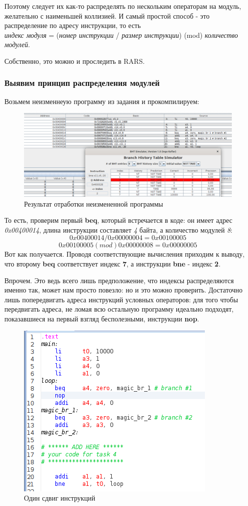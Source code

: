 Поэтому следует их как-то распределять по нескольким операторам на модуль, желательно с наименьшей коллизией. И самый простой способ - это распределение по адресу инструкции, то есть \\
\textit{индекс модуля} = (\textit{номер инструкции} / \textit{размер инструкции}) (mod) \textit{количество модулей}.

Собственно, это можно и проследить в RARS.

\subsubsection*{Выявим принцип распределения модулей}

Возьмем неизменнеую программу из задания и прокомпилируем:
\begin{figure}[H]
    \centering
    \includegraphics[width=1\linewidth]{Part1/index1.png}
    \caption{Результат отработки неизмененной программы}
\end{figure}

То есть, проверим первый \textbf{beq}, который встречается в коде: он имеет адрес \textit{0x00400014}, длина инструкции составляет \textit{4} байта, а количество модулей \textit{8}:\\
\[0x00400014 / 0x00000004 = 0x00100005\]
\[0x00100005 (mod) 0x00000008 = 0x00000005\]
Вот как получается. Проводя соответствующие вычисления приходим к выводу, что второму \textbf{beq} соответствует индекс \textbf{7}, а инструкции \textbf{bne} - индекс \textbf{2}.

Впрочем. Это ведь всего лишь предположение, что индексы распределяются именно так, может нам просто повезло: но и это можно проверить. Достаточно лишь попередвигать адреса инструкций условных операторов: для того чтобы передвигать адреса, не ломая всю остальную программу идеально подходят, показавшиеся на первый взгляд бесполезными, инструкции \textbf{nop}. 

\begin{figure}[H]
    \centering
    \includegraphics[width=0.5\linewidth]{Part1/nop1.png}
    \caption{Один сдвиг инструкций}
\end{figure}

